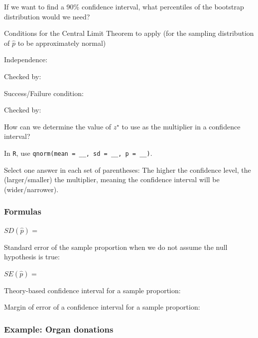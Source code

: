 \documentclass[
]{report}
\newcommand{\rgs}{\vspace{12pt}} %
\newcommand{\rgi}{\hspace{24pt}}  %
\begin{document}
If we want to find a 90\% confidence interval, what percentiles of the bootstrap distribution would we need?\\
\rgs

Conditions for the Central Limit Theorem to apply (for the sampling distribution of \(\hat{p}\) to be approximately normal)

\rgi Independence:
\rgs

\rgi \rgi Checked by:
\rgs

\rgi Success/Failure condition:
\rgs

\rgi \rgi Checked by:
\rgs

How can we determine the value of \(z^⋆\) to use as the multiplier in a confidence interval?
\rgs

\rgi In \texttt{R}, use \texttt{qnorm(mean\ =\ \_\_,\ sd\ =\ \_\_,\ p\ =\ \_\_)}.

Select one answer in each set of parentheses: The higher the confidence level, the (larger/smaller) the multiplier, meaning the confidence interval will be (wider/narrower).

\hypertarget{formulas-4}{%
\subsubsection*{Formulas}\label{formulas-4}}

\(SD(\hat{p})\) =
\rgs

Standard error of the sample proportion when we do not assume the null hypothesis is true:

\(SE(\hat{p})\) =
\rgs

Theory-based confidence interval for a sample proportion:
\rgs

Margin of error of a confidence interval for a sample proportion:
\rgs

\hypertarget{example-organ-donations-1}{%
\subsubsection*{Example: Organ donations}\label{example-organ-donations-1}}
\end{document}
